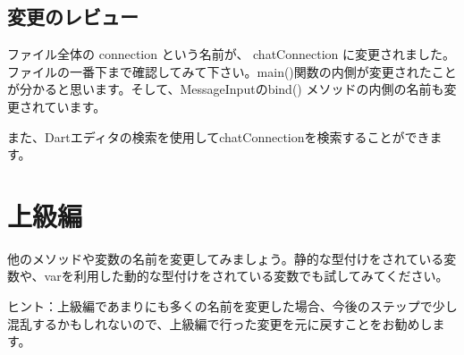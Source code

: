 
\subsection{変更のレビュー}

ファイル全体の connection という名前が、 chatConnection に変更されました。ファイルの一番下まで確認してみて下さい。main()関数の内側が変更されたことが分かると思います。そして、MessageInputのbind() メソッドの内側の名前も変更されています。

また、Dartエディタの検索を使用してchatConnectionを検索することができます。


\section{上級編}

他のメソッドや変数の名前を変更してみましょう。静的な型付けをされている変数や、varを利用した動的な型付けをされている変数でも試してみてください。

ヒント：上級編であまりにも多くの名前を変更した場合、今後のステップで少し混乱するかもしれないので、上級編で行った変更を元に戻すことをお勧めします。

\clearpage
